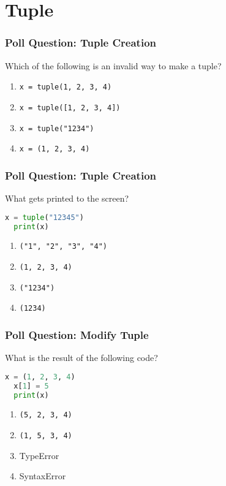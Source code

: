 \documentclass{beamer}
\begin{document}
\section{Tuple}

%
%
\begin{frame}[fragile]
  \frametitle{Poll Question: Tuple Creation}
  Which of the following is an invalid way to make a tuple? 
  \vfill
  \begin{enumerate}[A] 
    \item \lstinline|x = tuple(1, 2, 3, 4)|
    \item \lstinline|x = tuple([1, 2, 3, 4])|
    \item \lstinline|x = tuple("1234")|
    \item \lstinline|x = (1, 2, 3, 4)|
  \end{enumerate}
\end{frame}

%
%
\begin{frame}[fragile]
  \frametitle{Poll Question: Tuple Creation}
  What gets printed to the screen?
  \begin{lstlisting}[language=Python, autogobble]
  x = tuple("12345")
  print(x)
  \end{lstlisting}
  \vfill
  \begin{enumerate}[A] 
    \item \lstinline|("1", "2", "3", "4")|
    \item \lstinline|(1, 2, 3, 4)|
    \item \lstinline|("1234")|
    \item \lstinline|(1234)|
  \end{enumerate}
\end{frame}


%
%
\begin{frame}[fragile]
  \frametitle{Poll Question: Modify Tuple}
  What is the result of the following code?
  \begin{lstlisting}[language=Python, autogobble]
  x = (1, 2, 3, 4)
  x[1] = 5
  print(x)
  \end{lstlisting}
  \vfill
  \begin{enumerate}[A] 
    \item \lstinline|(5, 2, 3, 4)|
    \item \lstinline|(1, 5, 3, 4)|
    \item TypeError
    \item SyntaxError
  \end{enumerate}
\end{frame}
\end{document}
